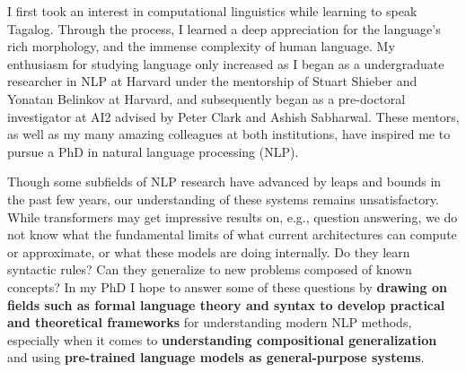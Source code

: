 \documentclass[11pt]{article}
\begin{document}
I first took an interest in computational linguistics 
while learning to speak Tagalog. 
Through the process, I learned a deep appreciation for the language's rich morphology,
and the immense complexity of human language.
My enthusiasm for studying language only increased
as I began as a undergraduate researcher in NLP at Harvard
under the mentorship of Stuart Shieber and Yonatan Belinkov at Harvard,
and subsequently began as a pre-doctoral investigator at AI2 
advised by Peter Clark and Ashish Sabharwal.
These mentors, as well as my many amazing colleagues at both institutions,
have inspired me to pursue a PhD in natural language processing (NLP).

Though some subfields of NLP research 
have advanced by leaps and bounds in the past few years,
our understanding of these systems remains unsatisfactory.
While transformers may get impressive results on, e.g., question answering,
we do not know what the fundamental limits 
of what current architectures can compute or approximate,
or what these models are doing internally.
Do they learn syntactic rules? 
Can they generalize to new problems composed of known concepts?
In my PhD I hope to answer some of these questions
by \textbf{drawing on fields such as formal language theory and syntax
to develop practical and theoretical frameworks} 
for understanding modern NLP methods, 
especially when it comes to \textbf{understanding compositional generalization} 
and using \textbf{pre-trained language models as general-purpose systems}.
\end{document}
